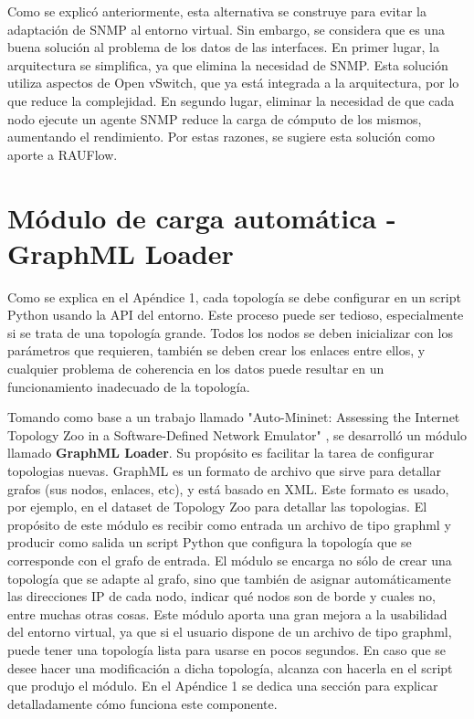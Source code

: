 Como se explicó anteriormente, esta alternativa se construye para evitar la adaptación de SNMP al entorno virtual. Sin embargo, se considera que es una buena solución al problema de los datos de las interfaces. En primer lugar, la arquitectura se simplifica, ya que elimina la necesidad de SNMP. Esta solución utiliza aspectos de Open vSwitch, que ya está integrada a la arquitectura, por lo que reduce la complejidad. En segundo lugar, eliminar la necesidad de que cada nodo ejecute un agente SNMP reduce la carga de cómputo de los mismos, aumentando el rendimiento. Por estas razones, se sugiere esta solución como aporte a RAUFlow.

\section{Módulo de carga automática - GraphML Loader}
Como se explica en el Apéndice 1, cada topología se debe configurar en un script Python usando la API del entorno. Este proceso puede ser tedioso, especialmente si se trata de una topología grande. Todos los nodos se deben inicializar con los parámetros que requieren, también se deben crear los enlaces entre ellos, y cualquier problema de coherencia en los datos puede resultar en un funcionamiento inadecuado de la topología.

Tomando como base a un trabajo llamado "Auto-Mininet: Assessing the Internet Topology Zoo in a Software-Defined Network Emulator" \cite{auto-mininet}, se desarrolló un módulo llamado \textbf{GraphML Loader}. Su propósito es facilitar la tarea de configurar topologias nuevas. GraphML es un formato de archivo que sirve para detallar grafos (sus nodos, enlaces, etc), y está basado en XML. Este formato es usado, por ejemplo, en el dataset de Topology Zoo \cite{topology-zoo} para detallar las topologias. El propósito de este módulo es recibir como entrada un archivo de tipo graphml y producir como salida un script Python que configura la topología que se corresponde con el grafo de entrada. El módulo se encarga no sólo de crear una topología que se adapte al grafo, sino que también de asignar automáticamente las direcciones IP de cada nodo, indicar qué nodos son de borde y cuales no, entre muchas otras cosas. Este módulo aporta una gran mejora a la usabilidad del entorno virtual, ya que si el usuario dispone de un archivo de tipo graphml, puede tener una topología lista para usarse en pocos segundos. En caso que se desee hacer una modificación a dicha topología, alcanza con hacerla en el script que produjo el módulo. En el Apéndice 1 se dedica una sección para explicar detalladamente cómo funciona este componente.

